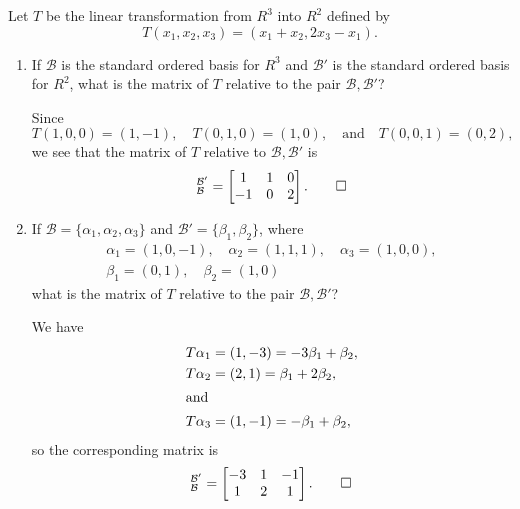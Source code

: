 Let $T$ be the linear transformation from $R^3$ into $R^2$
defined by
\begin{equation*}
  T(x_1,x_2,x_3) = (x_1 + x_2, 2x_3 - x_1).
\end{equation*}
\begin{enumerate}
\item If $\mathcal{B}$ is the standard ordered basis for $R^3$ and
  $\mathcal{B}'$ is the standard ordered basis for $R^2$, what is the
  matrix of $T$ relative to the pair $\mathcal{B},\mathcal{B}'$?
  \begin{solution}
    Since
    \begin{equation*}
      T(1, 0, 0) = (1, -1), \quad
      T(0, 1, 0) = (1, 0), \quad\text{and}\quad
      T(0, 0, 1) = (0, 2),
    \end{equation*}
    we see that the matrix of $T$ relative to
    $\mathcal{B},\mathcal{B}'$ is
    \begin{equation*}
      [T]_{\mathcal{B}}^{\mathcal{B}'} =
      \begin{bmatrix}
        1 & 1 & 0 \\
        -1 & 0 & 2
      \end{bmatrix}. \qedhere
    \end{equation*}
  \end{solution}

\item If $\mathcal{B} = \{\alpha_1,\alpha_2,\alpha_3\}$ and
  $\mathcal{B}' = \{\beta_1,\beta_2\}$, where
  \begin{multline*}
    \alpha_1 = (1, 0, -1), \quad
    \alpha_2 = (1, 1, 1), \quad
    \alpha_3 = (1, 0, 0), \\
    \beta_1 = (0, 1), \quad
    \beta_2 = (1, 0)
  \end{multline*}
  what is the matrix of $T$ relative to the pair
  $\mathcal{B},\mathcal{B}'$?
  \begin{solution}
    We have
    \begin{align*}
      T\alpha_1 &= (1, -3) = -3\beta_1 + \beta_2, \\
      T\alpha_2 &= (2, 1) = \beta_1 + 2\beta_2, \\
      \intertext{and}
      T\alpha_3 &= (1, -1) = -\beta_1 + \beta_2,
    \end{align*}
    so the corresponding matrix is
    \begin{equation*}
      [T]_{\mathcal{B}}^{\mathcal{B}'} =
      \begin{bmatrix}
        -3 & 1 & -1 \\
        1 & 2 & 1
      \end{bmatrix}. \qedhere
    \end{equation*}
  \end{solution}
\end{enumerate}
